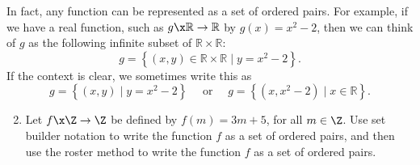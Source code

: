 \begin{previewactivity}
In fact, any function can be represented as a set of ordered pairs.  For example, if we have a real function, such as  $g\x \mathbb{R} \to \mathbb{R}$  by  $g( x ) = x^2  - 2$, then we can think of  $g$  as the following infinite subset of  $\mathbb{R} \times \mathbb{R}$:
\[
g = \left\{ { {( {x, y} ) \in \mathbb{R} \times \mathbb{R}} \mid y = x^2  - 2} \right\}\!.
\]
If the context is clear, we sometimes write this as
\[
g = \left\{ {( {x, y} )} \mid y = x^2  - 2 \right\} \quad \text{ or } \quad
g = \left\{ {( {x, x^2 - 2} )} \mid x \in \mathbb{R} \right\}\!.
\]


\begin{enumerate} \setcounter{enumi}{1}
\item Let $f\x \Z \to \Z$ be defined by $f(m) = 3m +5$, for all $m \in \Z$.  Use set builder notation to write the function $f$ as a set of ordered pairs, and then use the roster method to write the function $f$ as a set of ordered pairs.
\end{enumerate}
\end{previewactivity}


\endinput

